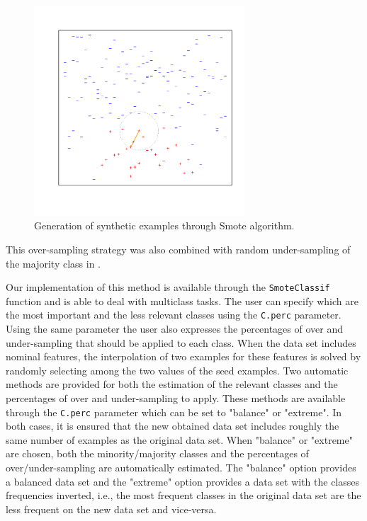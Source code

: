 \documentclass[10pt,a4paper]{article}\usepackage[]{graphicx}\usepackage[]{color}
\newenvironment{knitrout}{}{} %
\begin{document}
\begin{knitrout}\footnotesize
{}\color{fgcolor}\begin{figure}

{\centering \includegraphics[width=0.7\textwidth,height=0.4\textheight]{figures/UBL-smote_illust-1} 

}

\caption[Generation of synthetic examples through Smote algorithm]{Generation of synthetic examples through Smote algorithm.\label{smote_illust}}\label{fig:smote_illust}
\end{figure}


\end{knitrout}

This over-sampling strategy was also combined with random under-sampling of the majority class in \cite{CBOK02}. 


Our implementation of this method is available through the \texttt{SmoteClassif} function and is able to deal with multiclass tasks. The user can specify which are the most important and the less relevant classes using the \texttt{C.perc} parameter. Using the same parameter the user also expresses the percentages of over and under-sampling that should be applied to each class. When the data set includes nominal features, the interpolation of two examples for these features is solved by randomly selecting among the two values of the seed examples. Two automatic methods are provided for both the estimation of the relevant classes and the percentages of over and under-sampling to apply. These methods are available through the \texttt{C.perc} parameter which can be set to "balance" or "extreme". In both cases, it is ensured that the new obtained data set includes roughly the same number of examples as the original data set. When "balance" or "extreme" are chosen, both the minority/majority classes and the percentages of over/under-sampling are automatically estimated. The "balance" option provides a balanced data set and the "extreme" option provides a data set with the classes frequencies inverted, i.e., the most frequent classes in the original data set are the less frequent on the new data set and vice-versa.
\end{document}
